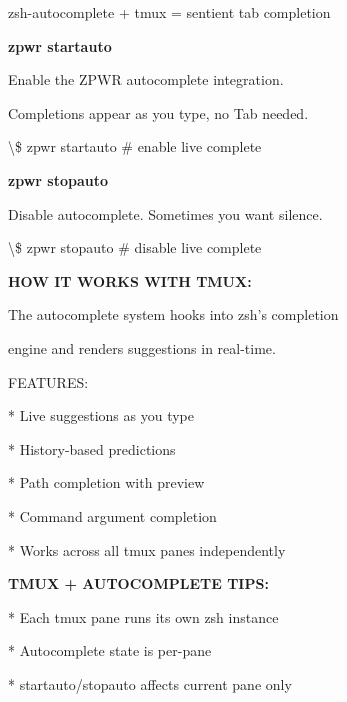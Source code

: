 \documentclass[11pt,a4paper,twoside]{book}
\begin{document}
zsh-autocomplete + tmux = sentient tab completion


\vspace{12pt}
{\bfseries\color{neonyellow} zpwr startauto}\vspace{4pt}

Enable the ZPWR autocomplete integration.

Completions appear as you type, no Tab needed.

\begin{codebox}
\textbackslash{}\$ zpwr startauto              \# enable live complete\\
\end{codebox}


\vspace{12pt}
{\bfseries\color{neonyellow} zpwr stopauto}\vspace{4pt}

Disable autocomplete. Sometimes you want silence.

\begin{codebox}
\textbackslash{}\$ zpwr stopauto               \# disable live complete\\
\end{codebox}


\vspace{12pt}
{\bfseries\color{neonyellow} HOW IT WORKS WITH TMUX:}\vspace{4pt}

The autocomplete system hooks into zsh's completion

engine and renders suggestions in real-time.

FEATURES:

* Live suggestions as you type

* History-based predictions

* Path completion with preview

* Command argument completion

\begin{codebox}
* Works across all tmux panes independently\\
\end{codebox}


\vspace{12pt}
{\bfseries\color{neonyellow} TMUX + AUTOCOMPLETE TIPS:}\vspace{4pt}

* Each tmux pane runs its own zsh instance

* Autocomplete state is per-pane

* startauto/stopauto affects current pane only
\end{document}
